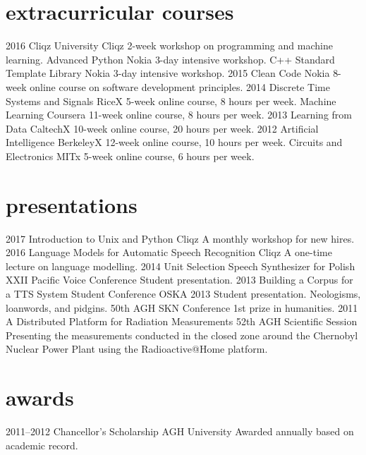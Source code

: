 \documentclass[]{friggeri-cv_osx}
\begin{document}
\section{extracurricular courses}
\begin{entrylist}
\entry
{2016}
{Cliqz University}
{Cliqz}
{2-week workshop on programming and machine learning.}
\entry
{}
{Advanced Python}
{Nokia}
{3-day intensive workshop.}
\entry
{}
{C++ Standard Template Library}
{Nokia}
{3-day intensive workshop.}
\entry
{2015}
{Clean Code}
{Nokia}
{8-week online course on software development principles.}
\entry
{2014}
{Discrete Time Systems and Signals}
{RiceX}
{5-week online course, 8 hours per week.}
\entry
{}
{Machine Learning}
{Coursera}
{11-week online course, 8 hours per week.}
\entry
{2013}
{Learning from Data}
{CaltechX}
{10-week online course, 20 hours per week.}
\entry
{2012}
{Artificial Intelligence}
{BerkeleyX}
{12-week online course, 10 hours per week.}
\entry
{}
{Circuits and Electronics}
{MITx}
{5-week online course, 6 hours per week.\\}
\end{entrylist}


\section{presentations}
\begin{entrylist}
\entry
{2017}
{Introduction to Unix and Python}
{Cliqz}
{A monthly workshop for new hires.}
\entry
{2016}
{Language Models for Automatic Speech Recognition}
{Cliqz}
{A one-time lecture on language modelling.}
\entry
{2014}
{Unit Selection Speech Synthesizer for Polish}
{XXII Pacific Voice Conference}
{Student presentation.}
\entry
{2013}
{Building a Corpus for a TTS System}
{Student Conference OSKA 2013}
{Student presentation.}
\entry
{}
{Neologisms, loanwords, and pidgins.}
{50th AGH SKN Conference}
{1st prize in humanities.}
\entry
{2011}
{A Distributed Platform for Radiation Measurements}
{52th AGH Scientific Session}
{Presenting the measurements conducted in the closed zone around the Chernobyl Nuclear Power Plant using the Radioactive@Home platform.}
\end{entrylist}


\section{awards}
\begin{entrylist}
\entry
{2011--2012}
{Chancellor's Scholarship}
{AGH University}
{Awarded annually based on academic record.}
\end{entrylist}
\end{document}
